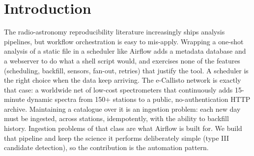 \documentclass[twocolumn]{aastex631}
\begin{document}

\section{Introduction}
The radio-astronomy reproducibility literature increasingly ships analysis pipelines, but workflow
orchestration is easy to mis-apply. Wrapping a one-shot analysis of a static file in a scheduler like
Airflow adds a metadata database and a webserver to do what a shell script would, and exercises none of
the features (scheduling, backfill, sensors, fan-out, retries) that justify the tool. A scheduler is the
right choice when the data keep arriving. The e-Callisto network \citep{benz2009} is exactly that
case: a worldwide net of low-cost spectrometers that continuously adds 15-minute dynamic spectra from
150+ stations to a public, no-authentication HTTP archive. Maintaining a catalogue over it is an
ingestion problem: each new day must be ingested, across stations, idempotently, with the ability to
backfill history. Ingestion problems of that class are what Airflow is built for. We build that pipeline and keep the science it
performs deliberately simple (type III candidate detection), so the contribution is the automation
pattern.
\end{document}

